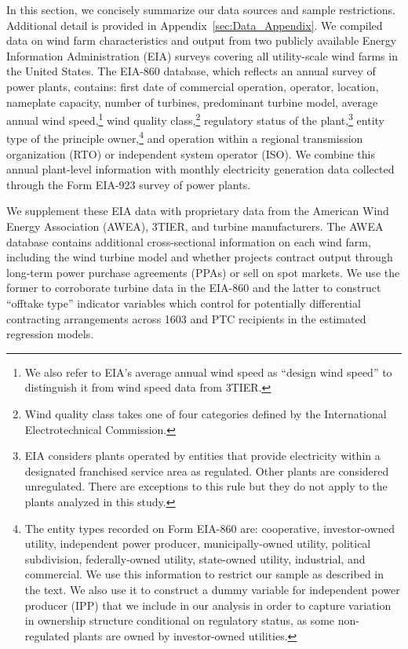 \documentclass[12pt]{article}
\begin{document}
In this section, we concisely summarize our data sources and sample restrictions. Additional detail is provided in Appendix~\ref{sec:Data_Appendix}. We compiled data on wind farm characteristics and output from two publicly available Energy Information Administration (EIA) surveys covering all utility-scale wind farms in the United States. The EIA-860 database, which reflects an annual survey of power plants, contains: first date of commercial operation, operator, location, nameplate capacity, number of turbines, predominant turbine model, average annual wind speed,\footnote{We also refer to EIA's average annual wind speed as ``design wind speed'' to distinguish it from wind speed data from 3TIER.} wind quality class,\footnote{Wind quality class takes one of four categories defined by the International Electrotechnical Commission.} regulatory status of the plant,\footnote{EIA considers plants operated by entities that provide electricity within a designated franchised service area as regulated. Other plants are considered unregulated. There are exceptions to this rule but they do not apply to the plants analyzed in this study.} entity type of the principle owner,\footnote{The entity types recorded on Form EIA-860 are: cooperative, investor-owned utility, independent power producer, municipally-owned utility, political subdivision, federally-owned utility, state-owned utility, industrial, and commercial. We use this information to restrict our sample as described in the text. We also use it to construct a dummy variable for independent power producer (IPP) that we include in our analysis in order to capture variation in ownership structure conditional on regulatory status, as some non-regulated plants are owned by investor-owned utilities.} and operation within a regional transmission organization (RTO) or independent system operator (ISO). We combine this annual plant-level information with monthly electricity generation data collected through the Form EIA-923 survey of power plants.

We supplement these EIA data with proprietary data from the American Wind Energy Association (AWEA), 3TIER, and turbine manufacturers. The AWEA database contains additional cross-sectional information on each wind farm, including the wind turbine model and whether projects contract output through long-term power purchase agreements (PPAs) or sell on spot markets. We use the former to corroborate turbine data in the EIA-860 and the latter to construct ``offtake type'' indicator variables which control for potentially differential contracting arrangements across 1603 and PTC recipients in the estimated regression models.
\end{document}
